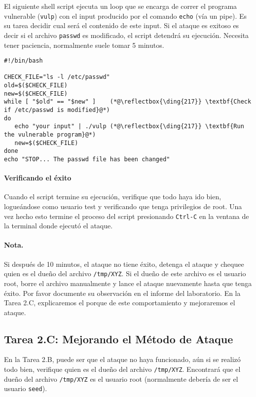 El siguiente shell script ejecuta un loop que se encarga de correr el programa vulnerable (\texttt{vulp}) con el input producido por el comando \texttt{echo} (vía un pipe).
Es su tarea decidir cual será el contenido de este input.
Si el ataque es exitoso es decir si el archivo \texttt{passwd} es modificado, el script detendrá su ejecución.
Necesita tener paciencia, normalmente suele tomar 5 minutos.

\begin{lstlisting}
#!/bin/bash

CHECK_FILE="ls -l /etc/passwd"
old=$($CHECK_FILE)
new=$($CHECK_FILE)
while [ "$old" == "$new" ]    (*@\reflectbox{\ding{217}} \textbf{Check if /etc/passwd is modified}@*)
do
   echo "your input" | ./vulp (*@\reflectbox{\ding{217}} \textbf{Run the vulnerable program}@*)
   new=$($CHECK_FILE)
done
echo "STOP... The passwd file has been changed"
\end{lstlisting}

\paragraph{Verificando el éxito}
Cuando el script termine su ejecución, verifique que todo haya ido bien, logueándose como usuario test y verificando que tenga privilegios de root. Una vez hecho esto termine el proceso del script presionando \texttt{Ctrl-C} en la ventana de la terminal donde ejecutó el ataque.

\paragraph{Nota.}
Si después de 10 minutos, el ataque no tiene éxito, detenga el ataque y chequee quien es el dueño del archivo \texttt{/tmp/XYZ}. Si el dueño de este archivo es el usuario root, borre el archivo manualmente y lance el ataque nuevamente hasta que tenga éxito.
Por favor documente su observación en el informe del laboratorio.
En la Tarea 2.C, explicaremos el porque de este comportamiento y mejoraremos el ataque.



\subsection{Tarea 2.C: Mejorando el Método de Ataque}

En la Tarea 2.B, puede ser que el ataque no haya funcionado, aún si se realizó todo bien, verifique quien es el dueño del archivo \texttt{/tmp/XYZ}. Encontrará que el dueño del archivo \texttt{/tmp/XYZ} es el usuario root (normalmente debería de ser el usuario \texttt{seed}).

